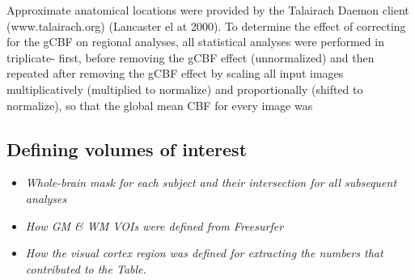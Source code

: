 Approximate anatomical locations were provided by the Talairach Daemon client (www.talairach.org) (Lancaster el at 2000). 
To determine the effect of correcting for the gCBF on regional analyses, all statistical analyses were performed in triplicate- first, before removing the gCBF effect (unnormalized) and then repeated after removing the gCBF effect by scaling all input images multiplicatively (multiplied to normalize) and proportionally (shifted to normalize), so that the global mean CBF for every image was 


\subsection{Defining volumes of interest}
\begin{itemize}
\item \textit{Whole-brain mask for each subject and their intersection for all subsequent analyses}
\item \textit{How GM & WM VOIs were defined from Freesurfer}
\item \textit{How the visual cortex region was defined for extracting the numbers that contributed to the Table.}
\end{itemize}






